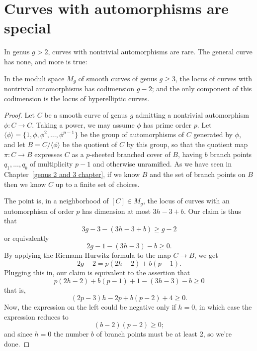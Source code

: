 \section{Curves with automorphisms are special}\label{curves with automorphisms}

In genus $g > 2$, curves with nontrivial automorphisms are rare. The general curve has none, and more is true:

\begin{lemma}
In the moduli space $M_g$ of smooth curves of genus $g \geq 3$, the locus of curves with nontrivial automorphisms has codimension $g-2$; and the only component of this codimension is the locus
of hyperelliptic curves.
\end{lemma}

\begin{proof} 
Let $C$ be a smooth curve of genus $g$ admitting a nontrivial automorphism $\phi : C \to C$. Taking a power, we may assume $\phi$ has prime order $p$. 
Let $\langle \phi \rangle = \{1, \phi, \phi^2,\dots,\phi^{p-1} \}$ be the group of automorphisms of $C$ generated by $\phi$, and let $B = C/\langle \phi \rangle $ be the quotient of $C$ by this group, so that the quotient map $\pi : C \to B$ expresses $C$ as a $p$-sheeted branched cover of $B$, having $b$ branch points $q_1,\dots, q_b$ of multiplicity $p-1$ and otherwise unramified.
As we have seen in Chapter~\ref{genus 2 and 3 chapter}, if we know $B$ and the set
of branch points on $B$ then we know $C$ up to a finite set of choices. 

The point is, in a neighborhood of $[C] \in M_g$, the locus of curves with an automorphism of order $p$ has dimension at most $3h-3 + b$. Our claim is thus that
$$
3g-3 - (3h-3+b) \geq g-2
$$
or equivalently
$$
2g - 1 - (3h-3) - b \geq 0.
$$
By applying the Riemann-Hurwitz formula to the map $C \to B$, we get
$$
2g-2 = p(2h-2) + b(p-1).
$$
Plugging this in, our claim is equivalent to the assertion that
$$
p(2h-2) + b(p-1) + 1 - (3h-3) - b \geq 0
$$
that is,
$$
(2p-3)h -2p + b(p-2) + 4 \geq 0.
$$
Now, the expression on the left could be negative only if $h=0$, in which case the expression reduces to
$$
(b-2)(p-2) \geq 0;
$$
and since $h=0$ the number $b$ of branch points must be at least 2, so we're done.
\end{proof}

